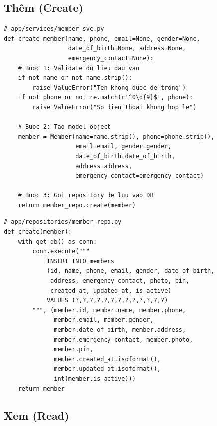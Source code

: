 \documentclass[12pt,a4paper]{article}
\begin{document}
\subsection{Thêm (Create)}

\begin{lstlisting}[style=pythonstyle, caption={Thêm hội viên mới -- Service Layer}]
# app/services/member_svc.py
def create_member(name, phone, email=None, gender=None,
                  date_of_birth=None, address=None,
                  emergency_contact=None):
    # Buoc 1: Validate du lieu dau vao
    if not name or not name.strip():
        raise ValueError("Ten khong duoc de trong")
    if not phone or not re.match(r'^0\d{9}$', phone):
        raise ValueError("So dien thoai khong hop le")

    # Buoc 2: Tao model object
    member = Member(name=name.strip(), phone=phone.strip(),
                    email=email, gender=gender,
                    date_of_birth=date_of_birth,
                    address=address,
                    emergency_contact=emergency_contact)

    # Buoc 3: Goi repository de luu vao DB
    return member_repo.create(member)
\end{lstlisting}

\begin{lstlisting}[style=pythonstyle, caption={Thêm hội viên -- Repository Layer}]
# app/repositories/member_repo.py
def create(member):
    with get_db() as conn:
        conn.execute("""
            INSERT INTO members
            (id, name, phone, email, gender, date_of_birth,
             address, emergency_contact, photo, pin,
             created_at, updated_at, is_active)
            VALUES (?,?,?,?,?,?,?,?,?,?,?,?,?)
        """, (member.id, member.name, member.phone,
              member.email, member.gender,
              member.date_of_birth, member.address,
              member.emergency_contact, member.photo,
              member.pin,
              member.created_at.isoformat(),
              member.updated_at.isoformat(),
              int(member.is_active)))
    return member
\end{lstlisting}

\subsection{Xem (Read)}
\end{document}
